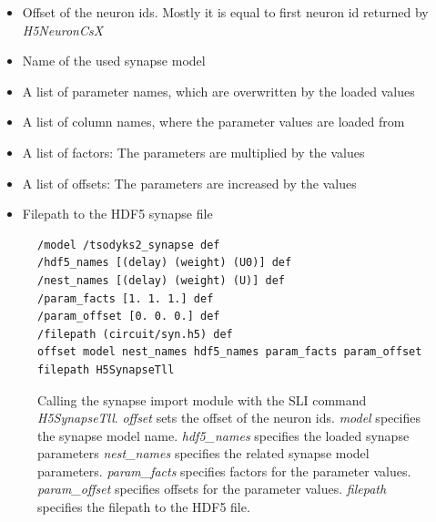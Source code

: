 \begin{itemize}
      \item Offset of the neuron ids. Mostly it is equal to first neuron id returned by \emph{H5NeuronCsX}
      \item Name of the used synapse model
      \item A list of parameter names, which are overwritten by the loaded values
      \item A list of column names, where the parameter values are loaded from
      \item A list of factors: The parameters are multiplied by the values
      \item A list of offsets: The parameters are increased by the values
      \item Filepath to the HDF5 synapse file
\end{itemize}
\begin{figure}[ht!]
\begin{lstlisting}[]
/model /tsodyks2_synapse def
/hdf5_names [(delay) (weight) (U0)] def
/nest_names [(delay) (weight) (U)] def
/param_facts [1. 1. 1.] def
/param_offset [0. 0. 0.] def
/filepath (circuit/syn.h5) def
offset model nest_names hdf5_names param_facts param_offset filepath H5SynapseTll
\end{lstlisting}
\caption[Calling the synapse import module with the SLI command \emph{H5SynapseTll}]{Calling the synapse import module with the
SLI command \emph{H5SynapseTll}.
\emph{offset} sets the offset of the neuron ids.
\emph{model} specifies the synapse model name.
\emph{hdf5\_names} specifies the loaded synapse parameters
\emph{nest\_names} specifies the related synapse model parameters.
\emph{param\_facts} specifies factors for the parameter values.
\emph{param\_offset} specifies offsets for the parameter values.
\emph{filepath} specifies the filepath to the HDF5 file.}
\end{figure}

